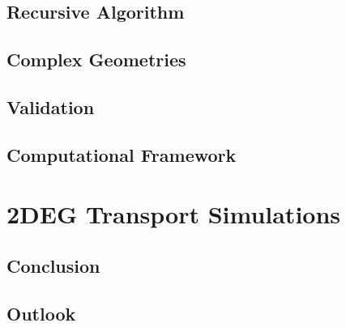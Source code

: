 \section{Recursive \cgfnc{} Algorithm} \label{sec:recursivegreenfncalgorithm}

\section{Complex Geometries}

\section{Validation}\label{sec:validation}

\section{Computational Framework}

\chapter{2DEG Transport Simulations}

\section{Conclusion}
\section{Outlook}
\appendix

\clearpage



